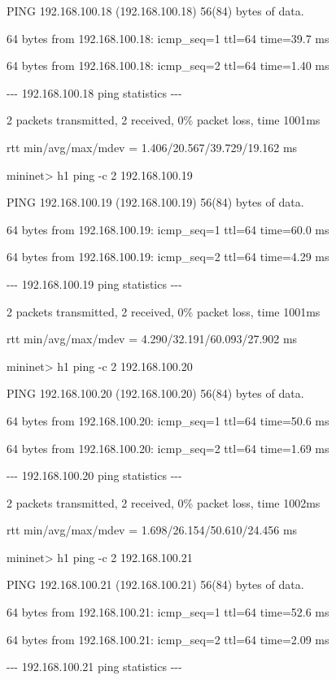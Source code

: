 PING 192.168.100.18 (192.168.100.18) 56(84) bytes of data.

64 bytes from 192.168.100.18: icmp\_seq=1 ttl=64 time=39.7 ms

64 bytes from 192.168.100.18: icmp\_seq=2 ttl=64 time=1.40 ms


\bigskip

{}-{}-{}- 192.168.100.18 ping statistics -{}-{}-

2 packets transmitted, 2 received, 0\% packet loss, time 1001ms

rtt min/avg/max/mdev = 1.406/20.567/39.729/19.162 ms

mininet{\textgreater} h1 ping -c 2 192.168.100.19

PING 192.168.100.19 (192.168.100.19) 56(84) bytes of data.

64 bytes from 192.168.100.19: icmp\_seq=1 ttl=64 time=60.0 ms

64 bytes from 192.168.100.19: icmp\_seq=2 ttl=64 time=4.29 ms


\bigskip

{}-{}-{}- 192.168.100.19 ping statistics -{}-{}-

2 packets transmitted, 2 received, 0\% packet loss, time 1001ms

rtt min/avg/max/mdev = 4.290/32.191/60.093/27.902 ms

mininet{\textgreater} h1 ping -c 2 192.168.100.20

PING 192.168.100.20 (192.168.100.20) 56(84) bytes of data.

64 bytes from 192.168.100.20: icmp\_seq=1 ttl=64 time=50.6 ms

64 bytes from 192.168.100.20: icmp\_seq=2 ttl=64 time=1.69 ms


\bigskip

{}-{}-{}- 192.168.100.20 ping statistics -{}-{}-

2 packets transmitted, 2 received, 0\% packet loss, time 1002ms

rtt min/avg/max/mdev = 1.698/26.154/50.610/24.456 ms

mininet{\textgreater} h1 ping -c 2 192.168.100.21

PING 192.168.100.21 (192.168.100.21) 56(84) bytes of data.

64 bytes from 192.168.100.21: icmp\_seq=1 ttl=64 time=52.6 ms

64 bytes from 192.168.100.21: icmp\_seq=2 ttl=64 time=2.09 ms


\bigskip

{}-{}-{}- 192.168.100.21 ping statistics -{}-{}-

